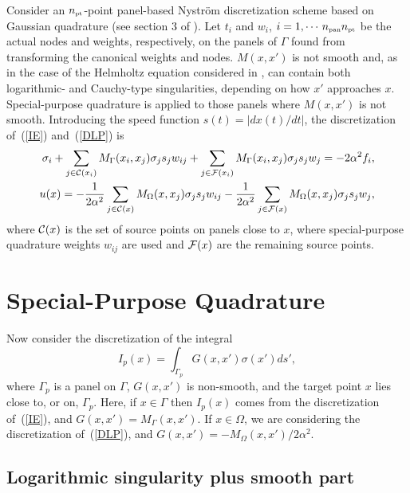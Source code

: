 \documentclass[12pt]{article}
\def\npan{n_{\mbox{\tiny{pan}}}}
\def\npt{n_{\mbox{\tiny{pt}}}}
\newcommand{\eqr}[1]{~(\ref{#1})}
\begin{document}
Consider an $\npt$-point panel-based Nystr\"om discretization scheme based on Gaussian quadrature (see section 3 of \cite{HelsingHolst}). Let $t_i$ and $w_i$, $i = 1, \cdots \, \npan \npt$ be the actual nodes and weights, respectively, on the panels of $\Gamma$ found from transforming the canonical weights and nodes. $M(x,x')$ is not smooth and, as in the case of the Helmholtz equation considered in \cite{HelsingHolst}, can contain both logarithmic- and Cauchy-type singularities, depending on how $x'$ approaches $x$. Special-purpose quadrature is applied to those panels where $M(x,x')$ is not smooth. Introducing the speed function $s(t) = |dx(t)/dt|$, the discretization of\eqr{IE} and\eqr{DLP} is
\begin{align}
\sigma_i + \sum_{j\in{\cal C}(x_i) } M_\Gamma(x_i, x_j) \sigma_j s_j w_{ij}
     + \sum_{j\in{\cal F}(x_i) } M_\Gamma(x_i, x_j) \sigma_j s_j w_{j} = -2 \alpha^2 f_i,  \label{discIE}\\
 u(x) = -\frac{1}{2\alpha^2} \sum_{j\in{\cal C}(x) } M_\Omega(x, x_j) \sigma_j s_j w_{ij}
           -\frac{1}{2\alpha^2} \sum_{j\in{\cal F}(x) } M_\Omega(x, x_j) \sigma_j s_j w_{j}, \label{discDM}
\end{align}
where ${\cal C}(x)$ is the set of source points on panels close to $x$, where special-purpose quadrature weights $w_{ij}$ are used and ${\cal F}(x)$ are the remaining source points.  

\section{Special-Purpose Quadrature}
Now consider the discretization of the integral
\begin{equation}
I_p(x) = \int_{\Gamma_p} G(x, x') \sigma(x') ds', 
\end{equation}
where $\Gamma_p$ is a panel on $\Gamma$, $G(x, x')$ is non-smooth, and the target point $x$ lies close to, or on, $\Gamma_p$. 
Here, if $x\in \Gamma$ then $I_p(x)$ comes from the discretization of\eqr{IE}, and $G(x, x') = M_\Gamma(x, x')$. 
If $x\in\Omega$, we are considering the discretization of\eqr{DLP}, and $G(x, x') = -M_\Omega(x, x')/2 \alpha^2$.

\subsection{Logarithmic singularity plus smooth part} 
\end{document}
